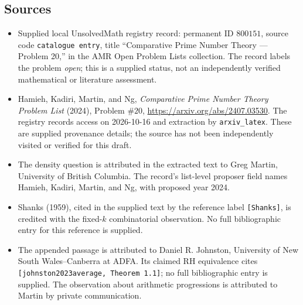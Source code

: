\documentclass[11pt]{article}
\begin{document}
\subsection{Sources}
\begin{itemize}
\item Supplied local UnsolvedMath registry record: permanent ID \(800151\), source code \texttt{catalogue entry}, title ``Comparative Prime Number Theory --- Problem 20,'' in the AMR Open Problem Lists collection. The record labels the problem \emph{open}; this is a supplied status, not an independently verified mathematical or literature assessment.
\item Hamieh, Kadiri, Martin, and Ng, \emph{Comparative Prime Number Theory Problem List} (2024), Problem \(\#20\), \url{https://arxiv.org/abs/2407.03530}. The registry records access on 2026-10-16 and extraction by \texttt{arxiv\_latex}. These are supplied provenance details; the source has not been independently visited or verified for this draft.
\item The density question is attributed in the extracted text to Greg Martin, University of British Columbia. The record's list-level proposer field names Hamieh, Kadiri, Martin, and Ng, with proposed year 2024.
\item Shanks (1959), cited in the supplied text by the reference label \texttt{[Shanks]}, is credited with the fixed-\(k\) combinatorial observation. No full bibliographic entry for this reference is supplied.
\item The appended passage is attributed to Daniel R. Johnston, University of New South Wales--Canberra at ADFA. Its claimed RH equivalence cites \texttt{[johnston2023average, Theorem 1.1]}; no full bibliographic entry is supplied. The observation about arithmetic progressions is attributed to Martin by private communication.
\end{itemize}
\end{document}
